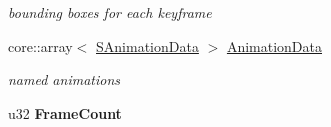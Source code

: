 \begin{DoxyCompactItemize}
\begin{DoxyCompactList}\small\item\em bounding boxes for each keyframe \end{DoxyCompactList}\item 
\hypertarget{classirr_1_1scene_1_1_c_animated_mesh_m_d2_a437344cb549e59cf8cd0c1c68b0eec46}{core\-::array$<$ \hyperlink{structirr_1_1scene_1_1_c_animated_mesh_m_d2_1_1_s_animation_data}{S\-Animation\-Data} $>$ \hyperlink{classirr_1_1scene_1_1_c_animated_mesh_m_d2_a437344cb549e59cf8cd0c1c68b0eec46}{Animation\-Data}}\label{classirr_1_1scene_1_1_c_animated_mesh_m_d2_a437344cb549e59cf8cd0c1c68b0eec46}

\begin{DoxyCompactList}\small\item\em named animations \end{DoxyCompactList}\item 
\hypertarget{classirr_1_1scene_1_1_c_animated_mesh_m_d2_ac8b23395823bf9f5788fdef4873e7b46}{u32 {\bfseries Frame\-Count}}\label{classirr_1_1scene_1_1_c_animated_mesh_m_d2_ac8b23395823bf9f5788fdef4873e7b46}

\end{DoxyCompactItemize}


